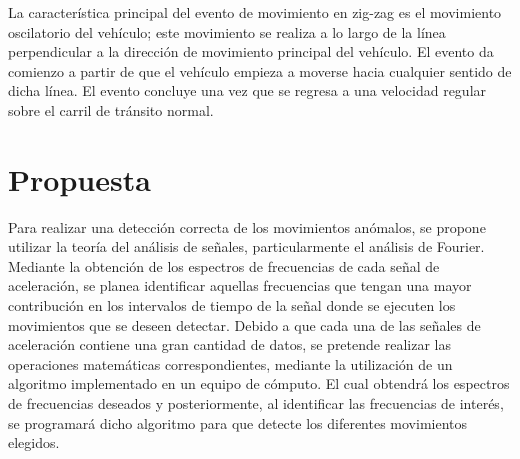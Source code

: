La característica principal del evento de movimiento en zig-zag es el movimiento oscilatorio del vehículo; este movimiento se realiza a lo largo de la línea perpendicular a la dirección de movimiento principal del vehículo.
El evento da comienzo a partir de que el vehículo empieza a moverse hacia cualquier sentido de dicha línea. 
El evento concluye una vez que se regresa a una velocidad regular sobre el carril de tránsito normal.

\section{Propuesta}

Para realizar una detección correcta de los movimientos anómalos, se propone utilizar la teoría del análisis de señales, particularmente el análisis de Fourier.
Mediante la obtención de los espectros de frecuencias de cada señal de aceleración, se planea identificar aquellas frecuencias que tengan una mayor contribución en los intervalos de tiempo de la señal donde se ejecuten los movimientos que se deseen detectar.
Debido a que cada una de las señales de aceleración contiene una gran cantidad de datos, se pretende realizar las operaciones matemáticas correspondientes, mediante la utilización de un algoritmo implementado en un equipo de cómputo.
El cual obtendrá los espectros de frecuencias deseados y posteriormente, al identificar las frecuencias de interés, se programará dicho algoritmo para que detecte los diferentes movimientos elegidos.

